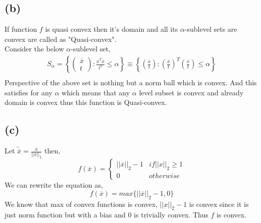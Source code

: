 \documentclass{article}
\begin{document}
\subsection*{(b)}
If function $f$ is quasi convex then it's domain and all its $\alpha$-sublevel sets are convex are called as "Quasi-convex".\\
Consider the below $\alpha$-sublevel set,
\begin{gather*}
	S_{\alpha} = \left\{\begin{pmatrix}
	\overline{x}\\
	t
	\end{pmatrix}: \frac{\overline{x}^T\overline{x}}{t^2} \le \alpha \right\} \equiv \left\{\left(\frac{\overline{x}}{t}\right): \left(\frac{\overline{x}}{t}\right)^T\left(\frac{\overline{x}}{t}\right) \le \alpha \right\} \\
\end{gather*}
Perspective of the above set is nothing but a norm ball which is convex. And this satisfies for any $\alpha$ which means that any $\alpha$ level subset is convex and already domain is convex thus this function is Quasi-convex.
\subsection*{(c)}
Let $\tilde{\overline{x}} = \frac{\overline{x}}{||\overline{x}||_2}$ then,
\begin{equation*}
	f(\overline{x}) = \begin{cases}
	||\overline{x}||_2 - 1 & if||x||_2 \ge 1\\
	0 & otherwise
	\end{cases}
\end{equation*}
We can rewrite the equation as,
\begin{equation*}
	f(\overline{x}) = max\{||\overline{x}||_2 - 1, 0\}
\end{equation*}
We know that max of convex functions is convex, $||x||_2-1$ is convex since it is just norm function but with a bias and 0 is trivially convex. Thus $f$ is convex.
\end{document}
